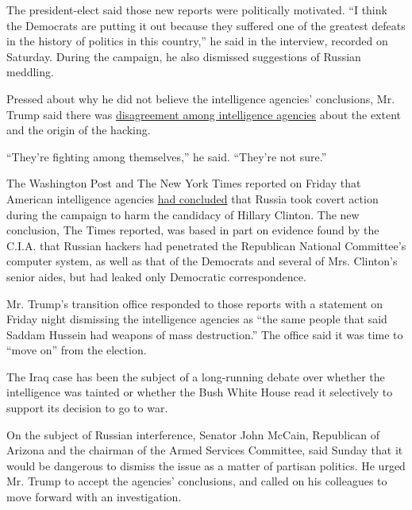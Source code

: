 The president-elect said those new reports were politically motivated.
``I think the Democrats are putting it out because they suffered one of
the greatest defeats in the history of politics in this country,'' he
said in the interview, recorded on Saturday. During the campaign, he
also dismissed suggestions of Russian meddling.

Pressed about why he did not believe the intelligence agencies'
conclusions, Mr. Trump said there was
\href{https://www.washingtonpost.com/world/national-security/fbi-and-cia-give-differing-accounts-to-lawmakers-on-russias-motives-in-2016-hacks/2016/12/10/c6dfadfa-bef0-11e6-94ac-3d324840106c_story.html?hpid=hp_hp-top-table-main_russiahack816pm\%3Ahomepage\%2Fstory\&utm_term=.a659d909067f}{disagreement
among intelligence agencies} about the extent and the origin of the
hacking.

``They're fighting among themselves,'' he said. ``They're not sure.''

The Washington Post and The New York Times reported on Friday that
American intelligence agencies
\href{http://www.nytimes.com/2016/12/09/us/obama-russia-election-hack.html?action=click\&contentCollection=Politics\&module=RelatedCoverage\&region=Marginalia\&pgtype=article}{had
concluded} that Russia took covert action during the campaign to harm
the candidacy of Hillary Clinton. The new conclusion, The Times
reported, was based in part on evidence found by the C.I.A. that Russian
hackers had penetrated the Republican National Committee's computer
system, as well as that of the Democrats and several of Mrs. Clinton's
senior aides, but had leaked only Democratic correspondence.

Mr. Trump's transition office responded to those reports with a
statement on Friday night dismissing the intelligence agencies as ``the
same people that said Saddam Hussein had weapons of mass destruction.''
The office said it was time to ``move on'' from the election.

The Iraq case has been the subject of a long-running debate over whether
the intelligence was tainted or whether the Bush White House read it
selectively to support its decision to go to war.

On the subject of Russian interference, Senator John McCain, Republican
of Arizona and the chairman of the Armed Services Committee, said Sunday
that it would be dangerous to dismiss the issue as a matter of partisan
politics. He urged Mr. Trump to accept the agencies' conclusions, and
called on his colleagues to move forward with an investigation.

